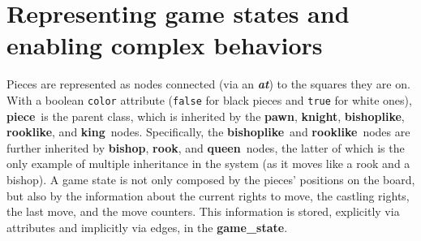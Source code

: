 \documentclass[a4paper, 10pt]{scrartcl}
\newcommand{\noderepr}[1]{\textsf{\textbf{#1}}}
\newcommand{\edgerepr}[1]{\textit{\textbf{#1}}}
\newcommand{\piece}{\noderepr{piece}}
\newcommand{\pawn}{\noderepr{pawn}}
\newcommand{\knight}{\noderepr{knight}}
\newcommand{\bishoplike}{\noderepr{bishoplike}}
\newcommand{\rooklike}{\noderepr{rooklike}}
\newcommand{\bishop}{\noderepr{bishop}}
\newcommand{\rook}{\noderepr{rook}}
\newcommand{\queen}{\noderepr{queen}}
\newcommand{\king}{\noderepr{king}}
\newcommand{\gamestate}{\noderepr{game\_state}}
\newcommand{\at}{\edgerepr{at}}
\begin{document}
    \section{Representing game states and enabling complex behaviors}
    Pieces are represented as nodes connected (via an \at) to the squares they are on. With a boolean \texttt{color} attribute (\texttt{false} for black pieces and \texttt{true} for white ones), \piece\ is the parent class, which is inherited by the \pawn, \knight, \bishoplike, \rooklike, and \king\ nodes. Specifically, the \bishoplike\ and \rooklike\ nodes are further inherited by \bishop, \rook, and \queen\ nodes, the latter of which is the only example of multiple inheritance in the system (as it moves like a rook and a bishop).
    A game state is not only composed by the pieces' positions on the board, but also by the information about the current rights to move, the castling rights, the last move, and the move counters. This information is stored, explicitly via attributes and implicitly via edges, in the \gamestate.
\end{document}
